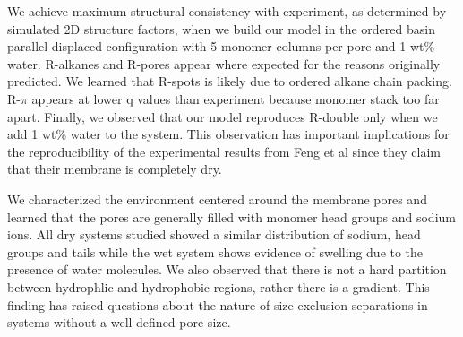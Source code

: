 \documentclass[journal=jpcbfk,manusciprt=article]{achemso}
\begin{document}
  We achieve maximum structural consistency with experiment, as determined by simulated
  2D structure factors, when we build our model in the ordered basin parallel displaced
  configuration with 5 monomer columns per pore and 1 wt\% water. R-alkanes and R-pores
  appear where expected for the reasons originally predicted. We learned that R-spots
  is likely due to ordered alkane chain packing. R-$\pi$ appears at lower q values than
  experiment because monomer stack too far apart. Finally, we observed that our model
  reproduces R-double only when we add 1 wt\% water to the system. This observation has
  important implications for the reproducibility of the experimental results from Feng 
  et al since they claim that their membrane is completely dry. 

  

  We characterized the environment centered around the membrane pores and
  learned that the pores are generally filled with monomer head groups and sodium
  ions. All dry systems studied showed a similar distribution of sodium, head groups 
  and tails while the wet system shows evidence of swelling due to the presence of 
  water molecules. We also observed that there is not a hard partition between hydrophlic
  and hydrophobic regions, rather there is a gradient. This finding has raised questions
  about the nature of size-exclusion separations in systems without a well-defined pore 
  size.  

\end{document}
